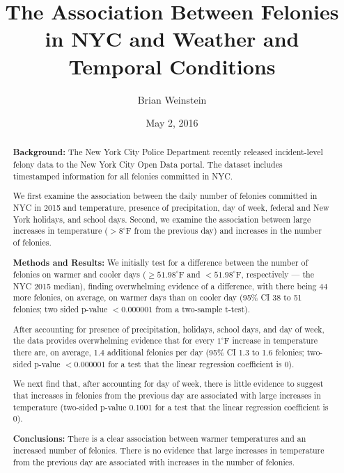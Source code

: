 \documentclass[12pt,notitlepage]{article}
\newcommand{\degf}{^\circ\text{F}}
\begin{document}
\title{The Association Between Felonies in NYC and Weather and Temporal Conditions}
\author{Brian Weinstein}
\date{May 2, 2016}

\maketitle



\begin{abstract}
\singlespacing

\noindent \textbf{Background:} The New York City Police Department recently released incident-level felony data to the New York City Open Data portal. The dataset includes timestamped information for all felonies committed in NYC.

We first examine the association between the daily number of felonies committed in NYC in 2015 and temperature, presence of precipitation, day of week, federal and New York holidays, and school days. Second, we examine the association between large increases in temperature ($>8 \degf$ from the previous day) and increases in the number of felonies.

\noindent \textbf{Methods and Results:} We initially test for a difference between the number of felonies on warmer and cooler days ($\geq 51.98 \degf$ and $< 51.98 \degf$, respectively --- the NYC 2015 median), finding overwhelming evidence of a difference, with there being 44 more felonies, on average, on warmer days than on cooler day (95\% CI 38 to 51 felonies; two sided p-value $<0.000001$ from a two-sample t-test).

After accounting for presence of precipitation, holidays, school days, and day of week, the data provides overwhelming evidence that for every $1 \degf$ increase in temperature there are, on average, 1.4 additional felonies per day (95\% CI 1.3 to 1.6 felonies; two-sided p-value $<0.000001$ for a test that the linear regression coefficient is 0).

We next find that, after accounting for day of week, there is little evidence to suggest that increases in felonies from the previous day are associated with large increases in temperature (two-sided p-value 0.1001 for a test that the linear regression coefficient is 0).

\noindent \textbf{Conclusions:} There is a clear association between warmer temperatures and an increased number of felonies. There is no evidence that large increases in temperature from the previous day are associated with increases in the number of felonies.




\end{abstract}
\end{document}
